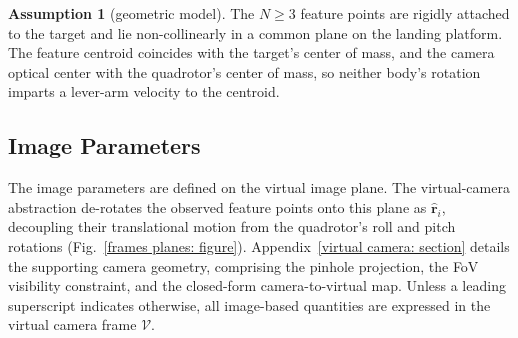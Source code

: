 \documentclass{IEEEtaes}
\theoremstyle{definition}
\newtheorem{assumption}{Assumption}
\theoremstyle{remark}
\begin{document}
\begin{assumption}[geometric model]\label{asm:features} The $N\ge 3$ feature points are rigidly attached to the target and lie non-collinearly in a common plane on the landing platform. The feature centroid coincides with the target's center of mass, and the camera optical center with the quadrotor's center of mass, so neither body's rotation imparts a lever-arm velocity to the centroid.\end{assumption}

\subsection{Image Parameters} \label{image parameters: section}
The image parameters are defined on the virtual image plane. The virtual-camera abstraction de-rotates the observed feature points onto this plane as $\hat{\boldsymbol{r}}_i$, decoupling their translational motion from the quadrotor's roll and pitch rotations (Fig.~\ref{frames planes: figure}). Appendix~\ref{virtual camera: section} details the supporting camera geometry, comprising the pinhole projection, the FoV visibility constraint, and the closed-form camera-to-virtual map. Unless a leading superscript indicates otherwise, all image-based quantities are expressed in the virtual camera frame $\mathcal{V}$.
\end{document}

